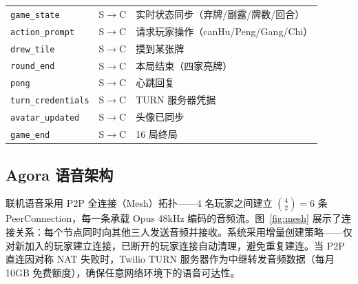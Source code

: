 \documentclass[11pt,a4paper]{article}
\begin{document}
\begin{table}[H]
\begin{tabular}{@{}llp{5cm}@{}}
\texttt{game\_state}      & S$\to$C & 实时状态同步（弃牌/副露/牌数/回合） \\
\texttt{action\_prompt}   & S$\to$C & 请求玩家操作（canHu/Peng/Gang/Chi） \\
\texttt{drew\_tile}       & S$\to$C & 摸到某张牌 \\
\texttt{round\_end}       & S$\to$C & 本局结束（四家亮牌） \\
\texttt{pong}            & S$\to$C & 心跳回复 \\
\texttt{turn\_credentials}& S$\to$C & TURN 服务器凭据 \\
\texttt{avatar\_updated}  & S$\to$C & 头像已同步 \\
\texttt{game\_end}        & S$\to$C & 16 局终局 \\
\bottomrule
\end{tabular}
\end{table}

\subsection{Agora 语音架构}

联机语音采用 P2P 全连接（Mesh）拓扑——4 名玩家之间建立 $\binom{4}{2}=6$ 条 PeerConnection，每一条承载 Opus 48kHz 编码的音频流。图~\ref{fig:mesh} 展示了连接关系：每个节点同时向其他三人发送音频并接收。系统采用增量创建策略——仅对新加入的玩家建立连接，已断开的玩家连接自动清理，避免重复建连。当 P2P 直连因对称 NAT 失败时，Twilio TURN 服务器作为中继转发音频数据（每月 10GB 免费额度），确保任意网络环境下的语音可达性。
\end{document}
